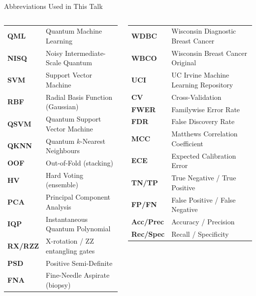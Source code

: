 \documentclass[aspectratio=169,11pt,t,xcolor={table}]{beamer}
\begin{document}
\begin{frame}{Abbreviations Used in This Talk}
  \footnotesize
  \setlength{\tabcolsep}{4pt}
  \renewcommand{\arraystretch}{1.1}
  \begin{columns}[T,onlytextwidth]
    \begin{column}{0.46\textwidth}
      \begin{tabular}{@{}>{\bfseries\color{qteal}}l L{49mm}@{}}
        \toprule
        QML  & Quantum Machine Learning \\
        NISQ & Noisy Intermediate-Scale Quantum \\
        SVM  & Support Vector Machine \\
        RBF  & Radial Basis Function (Gaussian) \\
        QSVM & Quantum Support Vector Machine \\
        QKNN & Quantum $k$-Nearest Neighbours \\
        OOF  & Out-of-Fold (stacking) \\
        HV   & Hard Voting (ensemble) \\
        PCA  & Principal Component Analysis \\
        IQP  & Instantaneous Quantum Polynomial \\
        RX/RZZ & X-rotation / ZZ entangling gates \\
        PSD  & Positive Semi-Definite \\
        FNA  & Fine-Needle Aspirate (biopsy) \\
        \bottomrule
      \end{tabular}
    \end{column}
    \begin{column}{0.52\textwidth}
      \begin{tabular}{@{}>{\bfseries\color{qteal}}l L{53mm}@{}}
        \toprule
        WDBC & Wisconsin Diagnostic Breast Cancer \\
        WBCO & Wisconsin Breast Cancer Original \\
        UCI  & UC Irvine Machine Learning Repository \\
        CV   & Cross-Validation \\
        FWER & Familywise Error Rate \\
        FDR  & False Discovery Rate \\
        MCC  & Matthews Correlation Coefficient \\
        ECE  & Expected Calibration Error \\
        TN/TP & True Negative / True Positive \\
        FP/FN & False Positive / False Negative \\
        Acc/Prec & Accuracy / Precision \\
        Rec/Spec & Recall / Specificity \\
        \bottomrule
      \end{tabular}
    \end{column}
  \end{columns}
\end{frame}
\end{document}
